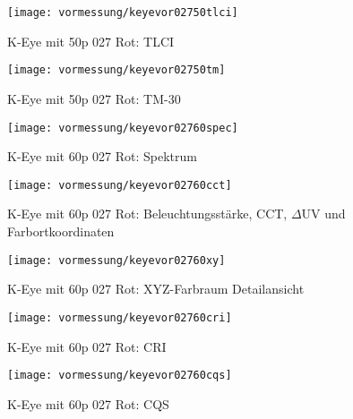 \documentclass[pagesize,paper=A4,fontsize=12pt,utf8,numbers=noenddot,bibliography=totoc,listof=totoc,DIV=11,BCOR=1mm]{scrreprt}
\begin{document}
\begin{figure}[htp]     %
\centering
\texttt{[image: vormessung/keyevor02750tlci]} 
\caption {K-Eye mit 50p 027 Rot: TLCI} 
\end{figure}

\begin{figure}[htp]     %
\centering
\texttt{[image: vormessung/keyevor02750tm]} 
\caption {K-Eye mit 50p 027 Rot: TM-30} 
\end{figure}




\begin{figure}[htp]     %
\centering
\texttt{[image: vormessung/keyevor02760spec]} 
\caption {K-Eye mit 60p 027 Rot: Spektrum} 
\end{figure}

\begin{figure}[htp]     %
\centering
\texttt{[image: vormessung/keyevor02760cct]} 
\caption {K-Eye mit 60p 027 Rot: Beleuchtungsstärke, CCT, $\Delta$UV und Farbortkoordinaten} 
\end{figure}

\begin{figure}[htp]     %
\centering
\texttt{[image: vormessung/keyevor02760xy]} 
\caption {K-Eye mit 60p 027 Rot: XYZ-Farbraum Detailansicht} 
\end{figure}

\begin{figure}[htp]     %
\centering
\texttt{[image: vormessung/keyevor02760cri]} 
\caption {K-Eye mit 60p 027 Rot: CRI} 
\end{figure}

\begin{figure}[htp]     %
\centering
\texttt{[image: vormessung/keyevor02760cqs]} 
\caption {K-Eye mit 60p 027 Rot: CQS} 
\end{figure}
\end{document}
